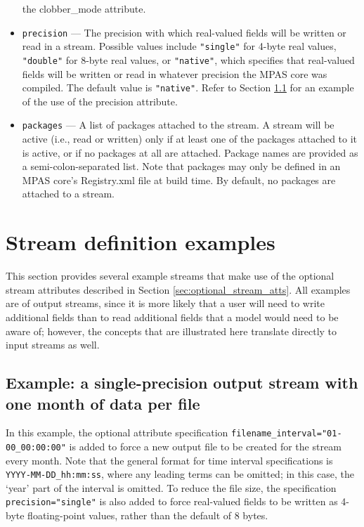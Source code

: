 \begin{itemize}
the clobber\_mode attribute.
\item {\tt precision} --- The precision with which real-valued fields will be written or read in a stream. Possible values include 
{\tt "single"} for 4-byte real values, {\tt "double"} for 8-byte real values, or {\tt "native"}, which specifies that real-valued fields
will be written or read in whatever precision the MPAS core was compiled. The default value is {\tt "native"}. Refer to Section \ref{sec:filename_interval_example}
for an example of the use of the precision attribute.
\item {\tt packages} --- A list of packages attached to the stream. A stream will be active (i.e., read or written) only if at least one of 
the packages attached to it is active, or if no packages at all are attached. Package names are provided as a semi-colon-separated
list. Note that packages may only be defined in an MPAS core's Registry.xml file at build time. By default, no packages are attached
to a stream.
\end{itemize}

\section{Stream definition examples}
\label{sec:stream_example} 

This section provides several example streams that make use of the optional stream attributes described in Section \ref{sec:optional_stream_atts}.
All examples are of output streams, since it is more likely that a user will need to write additional fields than to read additional fields
that a model would need to be aware of; however, the concepts that are illustrated here translate directly to input streams as well.

\subsection{Example: a single-precision output stream with one month of data per file}
\label{sec:filename_interval_example}

In this example, the optional attribute specification {\tt filename\_interval="01-00\_00:00:00"} is added to force a new
output file to be created for the stream every month. Note that the general format for time interval specifications is {\tt YYYY-MM-DD\_hh:mm:ss},
where any leading terms can be omitted; in this case, the `year' part of the interval is omitted. To reduce the file size, the specification
{\tt precision="single"} is also added to force real-valued fields to be written as 4-byte floating-point values, rather than the default of 8 bytes.

